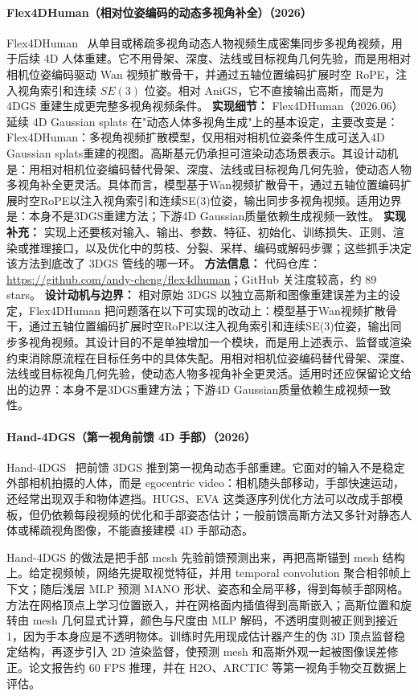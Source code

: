 \paragraph{Flex4DHuman（相对位姿编码的动态多视角补全）（2026）}
Flex4DHuman~\cite{2606_13655} 从单目或稀疏多视角动态人物视频生成密集同步多视角视频，用于后续 4D 人体重建。它不用骨架、深度、法线或目标视角几何先验，而是用相对相机位姿编码驱动 Wan 视频扩散骨干，并通过五轴位置编码扩展时空 RoPE，注入视角索引和连续 $SE(3)$ 位姿。相对 AniGS，它不直接输出高斯，而是为 4DGS 重建生成更完整多视角视频条件。
\textbf{实现细节：} Flex4DHuman（2026.06） 延续 4D Gaussian splats 在"动态人体多视角生成"上的基本设定，主要改变是：Flex4DHuman：多视角视频扩散模型，仅用相对相机位姿条件生成可送入4D Gaussian splats重建的视图。高斯基元仍承担可渲染动态场景表示。其设计动机是：用相对相机位姿编码替代骨架、深度、法线或目标视角几何先验，使动态人物多视角补全更灵活。具体而言，模型基于Wan视频扩散骨干，通过五轴位置编码扩展时空RoPE以注入视角索引和连续SE(3)位姿，输出同步多视角视频。适用边界是：本身不是3DGS重建方法；下游4D Gaussian质量依赖生成视频一致性。
\textbf{实现补充：} 实现上还要核对输入、输出、参数、特征、初始化、训练损失、正则、渲染或推理接口，以及优化中的剪枝、分裂、采样、编码或解码步骤；这些抓手决定该方法到底改了 3DGS 管线的哪一环。
\textbf{方法信息：} 代码仓库：\url{https://github.com/andy-cheng/flex4dhuman}；GitHub 关注度较高，约 89 stars。
\textbf{设计动机与边界：} 相对原始 3DGS 以独立高斯和图像重建误差为主的设定，Flex4DHuman 把问题落在以下可实现的改动上：模型基于Wan视频扩散骨干，通过五轴位置编码扩展时空RoPE以注入视角索引和连续SE(3)位姿，输出同步多视角视频。其设计目的不是单独增加一个模块，而是用上述表示、监督或渲染约束消除原流程在目标任务中的具体失配。用相对相机位姿编码替代骨架、深度、法线或目标视角几何先验，使动态人物多视角补全更灵活。适用时还应保留论文给出的边界：本身不是3DGS重建方法；下游4D Gaussian质量依赖生成视频一致性。
\paragraph{Hand-4DGS（第一视角前馈 4D 手部）（2026）}
Hand-4DGS~\cite{2606_19156} 把前馈 3DGS 推到第一视角动态手部重建。它面对的输入不是稳定外部相机拍摄的人体，而是 egocentric video：相机随头部移动，手部快速运动，还经常出现双手和物体遮挡。HUGS、EVA 这类逐序列优化方法可以改成手部模板，但仍依赖每段视频的优化和手部姿态估计；一般前馈高斯方法又多针对静态人体或稀疏视角图像，不能直接建模 4D 手部动态。

Hand-4DGS 的做法是把手部 mesh 先验前馈预测出来，再把高斯锚到 mesh 结构上。给定视频帧，网络先提取视觉特征，并用 temporal convolution 聚合相邻帧上下文；随后浅层 MLP 预测 MANO 形状、姿态和全局平移，得到每帧手部网格。方法在网格顶点上学习位置嵌入，并在网格面内插值得到高斯嵌入；高斯位置和旋转由 mesh 几何显式计算，颜色与尺度由 MLP 解码，不透明度则被正则到接近 1，因为手本身应是不透明物体。训练时先用现成估计器产生的伪 3D 顶点监督稳定结构，再逐步引入 2D 渲染监督，使预测 mesh 和高斯外观一起被图像误差修正。论文报告约 60 FPS 推理，并在 H2O、ARCTIC 等第一视角手物交互数据上评估。

